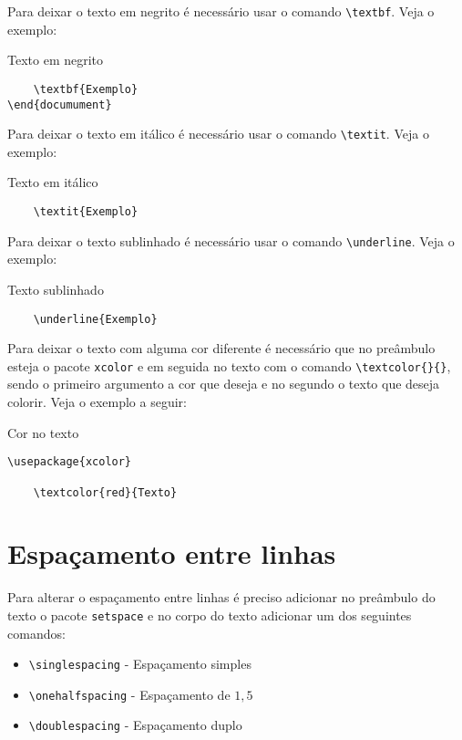 \noindent Para deixar o texto em negrito é necessário usar o comando \verb|\textbf|. Veja o exemplo:
\begin{trailer}{Texto em negrito}

\begin{verbatim}
    \textbf{Exemplo}
\end{documument}\end{verbatim}
\end{trailer}

\noindent Para deixar o texto em itálico é necessário usar o comando \verb|\textit|. Veja o exemplo:
\begin{trailer}{Texto em itálico}
\begin{verbatim}
    \textit{Exemplo}
\end{verbatim}
\end{trailer}

\noindent Para deixar o texto sublinhado é necessário usar o comando \verb|\underline|. Veja o exemplo:
\begin{trailer}{Texto sublinhado}
\begin{verbatim}
    \underline{Exemplo}
\end{verbatim}
\end{trailer}

\noindent Para deixar o texto com alguma cor diferente é necessário que no preâmbulo esteja o pacote \verb|xcolor| e em seguida no texto com o comando \verb|\textcolor{}{}|, sendo o primeiro argumento a cor que deseja e no segundo o texto que deseja colorir. Veja o exemplo a seguir:
\begin{trailer}{Cor no texto}
\begin{verbatim}
\usepackage{xcolor}  

    \textcolor{red}{Texto}

\end{verbatim}
\end{trailer}

%
\section{Espaçamento entre linhas}
Para alterar o espaçamento entre linhas é preciso adicionar no preâmbulo do texto o pacote \verb|setspace| e no  corpo do texto adicionar um dos seguintes comandos:
\begin{itemize}
    \item \verb|\singlespacing| - Espaçamento simples
    \item \verb|\onehalfspacing| - Espaçamento de $1,5$
    \item \verb|\doublespacing| - Espaçamento duplo
\end{itemize}

